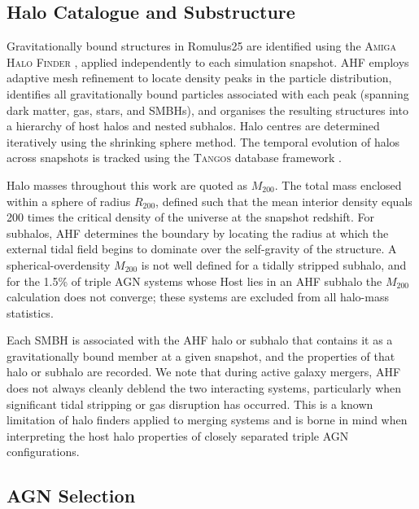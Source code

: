 \documentclass[twocolumn, 10pt]{article}
\begin{document}
\subsection{Halo Catalogue and Substructure}
\label{subsec:halos}

Gravitationally bound structures in Romulus25 are identified using the \textsc{Amiga Halo Finder} \citep[AHF;][]{Knollmann2009}, applied independently to each simulation snapshot. AHF employs adaptive mesh refinement to locate density peaks in the particle distribution, identifies all gravitationally bound particles associated with each peak (spanning dark matter, gas, stars, and SMBHs), and organises the resulting structures into a hierarchy of host halos and nested subhalos. Halo centres are determined iteratively using the shrinking sphere method. The temporal evolution of halos across snapshots is tracked using the \textsc{Tangos} database framework \citep{Pontzen2018}.

Halo masses throughout this work are quoted as $M_{200}$. The total mass enclosed within a sphere of radius $R_{200}$, defined such that the mean interior density equals 200 times the critical density of the universe at the snapshot redshift. For subhalos, AHF determines the boundary by locating the radius at which the external tidal field begins to dominate over the self-gravity of the structure. A spherical-overdensity $M_{200}$ is not well defined for a tidally stripped subhalo, and for the 1.5\% of triple AGN systems whose Host lies in an AHF subhalo the $M_{200}$ calculation does not converge; these systems are excluded from all halo-mass statistics.

Each SMBH is associated with the AHF halo or subhalo that contains it as a gravitationally bound member at a given snapshot, and the properties of that halo or subhalo are recorded. We note that during active galaxy mergers, AHF does not always cleanly deblend the two interacting systems, particularly when significant tidal stripping or gas disruption has occurred. This is a known limitation of halo finders applied to merging systems \citep{Saeedzadeh2024} and is borne in mind when interpreting the host halo properties of closely separated triple AGN configurations.

\subsection{AGN Selection}
\label{subsec:agn_selection}
\end{document}
